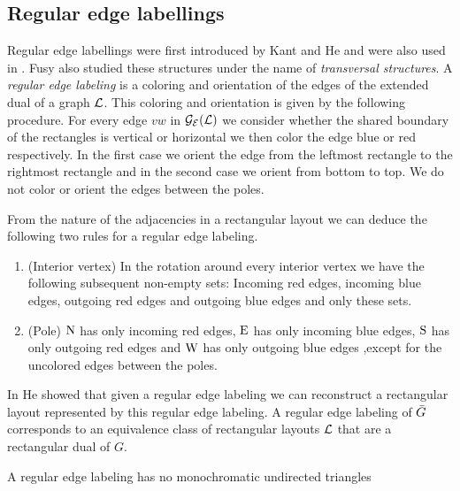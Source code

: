 \subsection{Regular edge labellings}
  Regular edge labellings were first introduced by Kant and He \cite{Kant1997} and were also used in \cite{Eppstein2012}. Fusy also studied these structures \cite{Fusy2006,Fusy2009} under the name of \emph{transversal structures}.
  A \emph{regular edge labeling} is a coloring and orientation of the edges of the extended dual of a graph $\mathcal{L}$. This coloring and orientation is given by the following procedure. For every edge $vw$ in $\mathcal{G}_{\mathcal{E}}(\mathcal{L})$ we consider whether the shared boundary of the rectangles is vertical or horizontal we then color the edge blue or red respectively. In the first case we orient the edge from the leftmost rectangle to the rightmost rectangle and in the second case we orient from bottom to top. We do not color or orient the edges between the poles.

  From the nature of the adjacencies in a rectangular layout we can deduce the following two rules for a regular edge labeling.
  \begin{enumerate}
    \item (Interior vertex) In the rotation around every interior vertex we have the following subsequent non-empty sets: Incoming red edges, incoming blue edges, outgoing red edges and outgoing blue edges and only these sets.
    \item (Pole) $\mathrm{N}$ has only incoming red edges, $\mathrm{E}$ has only incoming blue edges, $\mathrm{S}$ has only outgoing red edges and $\mathrm{W}$ has only outgoing blue edges ,except for the uncolored edges between the poles.
  \end{enumerate}

  In \cite{He1993} He showed that given a regular edge labeling we can reconstruct a rectangular layout represented by this regular edge labeling.
  A regular edge labeling  of $\bar{G}$ corresponds to an equivalence class of rectangular layouts $\mathcal{L}$ that are a rectangular dual of $G$.

  \begin{lemma}
    \label{lm:rel:noMonoColoredTriangles}
    A regular edge labeling has no monochromatic undirected triangles
  \end{lemma}


